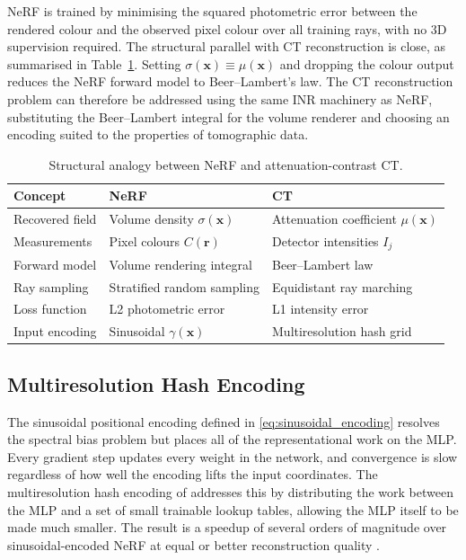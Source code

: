 \documentclass[12pt, a4paper, twoside]{report}
\begin{document}
NeRF is trained by minimising the squared photometric error between the rendered colour and the observed pixel colour over all training rays, with no 3D supervision required. The structural parallel with CT reconstruction is close, as summarised in Table~\ref{tab:nerf_ct_analogy}. Setting $\sigma(\mathbf{x}) \equiv \mu(\mathbf{x})$ and dropping the colour output reduces the NeRF forward model to Beer--Lambert's law. The CT reconstruction problem can therefore be addressed using the same INR machinery as NeRF, substituting the Beer--Lambert integral for the volume renderer and choosing an encoding suited to the properties of tomographic data.

\begin{table}[h]
    \centering
    \caption{Structural analogy between NeRF and attenuation-contrast CT.}
    \label{tab:nerf_ct_analogy}
    \begin{tabular}{lll}
        \toprule
        \textbf{Concept} & \textbf{NeRF} & \textbf{CT} \\
        \midrule
        Recovered field    & Volume density $\sigma(\mathbf{x})$    & Attenuation coefficient $\mu(\mathbf{x})$ \\
        Measurements       & Pixel colours $C(\mathbf{r})$           & Detector intensities $I_j$               \\
        Forward model      & Volume rendering integral               & Beer--Lambert law                        \\
        Ray sampling       & Stratified random sampling              & Equidistant ray marching                 \\
        Loss function      & L2 photometric error                    & L1 intensity error                       \\
        Input encoding     & Sinusoidal $\gamma(\mathbf{x})$         & Multiresolution hash grid                \\
        \bottomrule
    \end{tabular}
\end{table}

\subsection{Multiresolution Hash Encoding}
\label{subsubsec:hash_encoding}

The sinusoidal positional encoding defined in \cref{eq:sinusoidal_encoding} resolves the spectral bias problem but places all of the representational work on the MLP. Every gradient step updates every weight in the network, and convergence is slow regardless of how well the encoding lifts the input coordinates. The multiresolution hash encoding of \citet{mueller2022instant} addresses this by distributing the work between the MLP and a set of small trainable lookup tables, allowing the MLP itself to be made much smaller. The result is a speedup of several orders of magnitude over sinusoidal-encoded NeRF at equal or better reconstruction quality \citep{mueller2022instant}.
\end{document}
